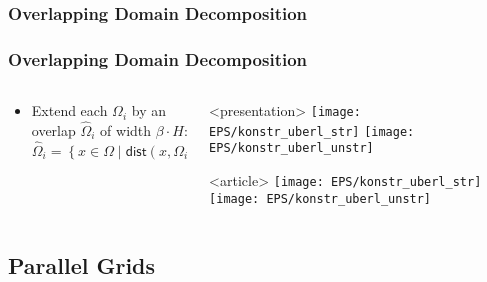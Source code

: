 \subsubsection{Overlapping Domain Decomposition}
\begin{frame}
  \frametitle<presentation>{Overlapping Domain Decomposition}

  \begin{columns}
    \begin{column}{0.6\linewidth}

      \begin{itemize}
      \item Extend each $\Omega_i$ by an overlap $\hat \Omega_i$ of width
        $\beta\cdot H$:
        \[
        \hat \Omega_i = \left\{ x\in\Omega \mid \mathsf{dist}(x,\Omega_i) < \beta\cdot H \right\}
        \]
      \end{itemize}
    \end{column}
    \begin{column}{0.4\linewidth}
      \begin{onlyenv}<presentation>
        \texttt{[image: EPS/konstr\_uberl\_str]}
        \vskip5mm
        \texttt{[image: EPS/konstr\_uberl\_unstr]}
      \end{onlyenv}
      \begin{onlyenv}<article>
        \texttt{[image: EPS/konstr\_uberl\_str]}
        \vskip5mm
        \texttt{[image: EPS/konstr\_uberl\_unstr]}
      \end{onlyenv}
    \end{column}
  \end{columns}
\end{frame}

\subsection{Parallel Grids}

